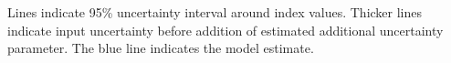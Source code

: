 \documentclass[12pt,]{article}
\begin{document}
\FloatBarrier

\vspace{3cm}

\noindent

\begin{minipage}{\linewidth}%
\label{fig:index2_cpuefit_WCGBTS}%
\begin{centering}
Lines indicate 95\% uncertainty interval around index values. Thicker lines indicate input uncertainty before addition of estimated additional uncertainty parameter. The blue line indicates the model estimate.
\end{centering}
\end{minipage}

\FloatBarrier
\end{document}
